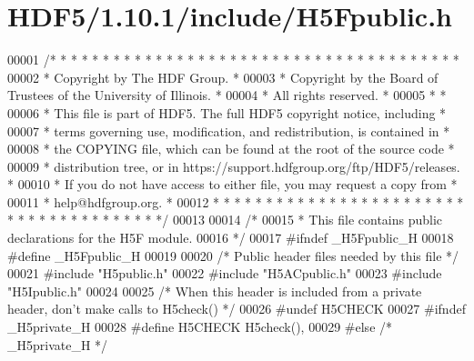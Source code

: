 \hypertarget{_h_d_f5_21_810_81_2include_2_h5_fpublic_8h_source}{}\section{H\+D\+F5/1.10.1/include/\+H5\+Fpublic.h}
\label{_h_d_f5_21_810_81_2include_2_h5_fpublic_8h_source}

\begin{DoxyCode}
00001 \textcolor{comment}{/* * * * * * * * * * * * * * * * * * * * * * * * * * * * * * * * * * * * * * *}
00002 \textcolor{comment}{ * Copyright by The HDF Group.                                               *}
00003 \textcolor{comment}{ * Copyright by the Board of Trustees of the University of Illinois.         *}
00004 \textcolor{comment}{ * All rights reserved.                                                      *}
00005 \textcolor{comment}{ *                                                                           *}
00006 \textcolor{comment}{ * This file is part of HDF5.  The full HDF5 copyright notice, including     *}
00007 \textcolor{comment}{ * terms governing use, modification, and redistribution, is contained in    *}
00008 \textcolor{comment}{ * the COPYING file, which can be found at the root of the source code       *}
00009 \textcolor{comment}{ * distribution tree, or in https://support.hdfgroup.org/ftp/HDF5/releases.  *}
00010 \textcolor{comment}{ * If you do not have access to either file, you may request a copy from     *}
00011 \textcolor{comment}{ * help@hdfgroup.org.                                                        *}
00012 \textcolor{comment}{ * * * * * * * * * * * * * * * * * * * * * * * * * * * * * * * * * * * * * * */}
00013 
00014 \textcolor{comment}{/*}
00015 \textcolor{comment}{ * This file contains public declarations for the H5F module.}
00016 \textcolor{comment}{ */}
00017 \textcolor{preprocessor}{#ifndef \_H5Fpublic\_H}
00018 \textcolor{preprocessor}{#define \_H5Fpublic\_H}
00019 
00020 \textcolor{comment}{/* Public header files needed by this file */}
00021 \textcolor{preprocessor}{#include "H5public.h"}
00022 \textcolor{preprocessor}{#include "H5ACpublic.h"}
00023 \textcolor{preprocessor}{#include "H5Ipublic.h"}
00024 
00025 \textcolor{comment}{/* When this header is included from a private header, don't make calls to H5check() */}
00026 \textcolor{preprocessor}{#undef H5CHECK}
00027 \textcolor{preprocessor}{#ifndef \_H5private\_H}
00028 \textcolor{preprocessor}{#define H5CHECK          H5check(),}
00029 \textcolor{preprocessor}{#else   }\textcolor{comment}{/* \_H5private\_H */}\textcolor{preprocessor}{}

\end{DoxyCode}
